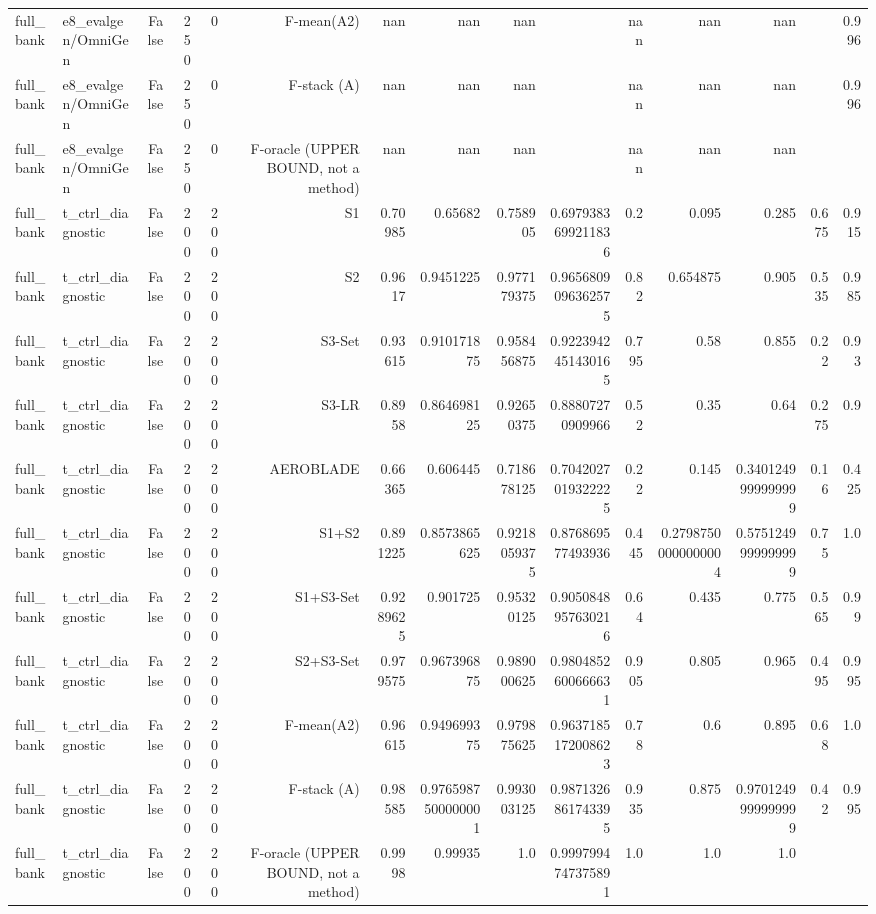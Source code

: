 \begin{table}[htbp]
\begin{tabular}{llrrrrrrrrrrrrr}
full\_bank & e8\_evalgen/OmniGen & False & 250 & 0 & F-mean(A2) & nan & nan & nan &  & nan & nan & nan &  & 0.996 \\
full\_bank & e8\_evalgen/OmniGen & False & 250 & 0 & F-stack (A) & nan & nan & nan &  & nan & nan & nan &  & 0.996 \\
full\_bank & e8\_evalgen/OmniGen & False & 250 & 0 & F-oracle (UPPER BOUND, not a method) & nan & nan & nan &  & nan & nan & nan &  &  \\
full\_bank & t\_ctrl\_diagnostic & False & 200 & 200 & S1 & 0.70985 & 0.65682 & 0.758905 & 0.6979383699211836 & 0.2 & 0.095 & 0.285 & 0.675 & 0.915 \\
full\_bank & t\_ctrl\_diagnostic & False & 200 & 200 & S2 & 0.9617 & 0.9451225 & 0.977179375 & 0.9656809096362575 & 0.82 & 0.654875 & 0.905 & 0.535 & 0.985 \\
full\_bank & t\_ctrl\_diagnostic & False & 200 & 200 & S3-Set & 0.93615 & 0.910171875 & 0.958456875 & 0.9223942451430165 & 0.795 & 0.58 & 0.855 & 0.22 & 0.93 \\
full\_bank & t\_ctrl\_diagnostic & False & 200 & 200 & S3-LR & 0.8958 & 0.864698125 & 0.92650375 & 0.88807270909966 & 0.52 & 0.35 & 0.64 & 0.275 & 0.9 \\
full\_bank & t\_ctrl\_diagnostic & False & 200 & 200 & AEROBLADE & 0.66365 & 0.606445 & 0.718678125 & 0.7042027019322225 & 0.22 & 0.145 & 0.3401249999999999 & 0.16 & 0.425 \\
full\_bank & t\_ctrl\_diagnostic & False & 200 & 200 & S1+S2 & 0.891225 & 0.8573865625 & 0.9218059375 & 0.876869577493936 & 0.445 & 0.27987500000000004 & 0.5751249999999999 & 0.75 & 1.0 \\
full\_bank & t\_ctrl\_diagnostic & False & 200 & 200 & S1+S3-Set & 0.9289625 & 0.901725 & 0.95320125 & 0.9050848957630216 & 0.64 & 0.435 & 0.775 & 0.565 & 0.99 \\
full\_bank & t\_ctrl\_diagnostic & False & 200 & 200 & S2+S3-Set & 0.979575 & 0.967396875 & 0.989000625 & 0.9804852600666631 & 0.905 & 0.805 & 0.965 & 0.495 & 0.995 \\
full\_bank & t\_ctrl\_diagnostic & False & 200 & 200 & F-mean(A2) & 0.96615 & 0.949699375 & 0.979875625 & 0.9637185172008623 & 0.78 & 0.6 & 0.895 & 0.68 & 1.0 \\
full\_bank & t\_ctrl\_diagnostic & False & 200 & 200 & F-stack (A) & 0.98585 & 0.9765987500000001 & 0.993003125 & 0.9871326861743395 & 0.935 & 0.875 & 0.9701249999999999 & 0.42 & 0.995 \\
full\_bank & t\_ctrl\_diagnostic & False & 200 & 200 & F-oracle (UPPER BOUND, not a method) & 0.9998 & 0.99935 & 1.0 & 0.9997994747375891 & 1.0 & 1.0 & 1.0 &  &  \\
\bottomrule
\end{tabular}
\end{table}
